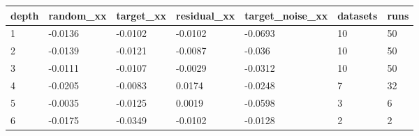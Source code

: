 \begin{tabular}{lllllll}
\toprule
depth & random\_xx & target\_xx & residual\_xx & target\_noise\_xx & datasets & runs \\
\midrule
1 & -0.0136 & -0.0102 & -0.0102 & -0.0693 & 10 & 50 \\
2 & -0.0139 & -0.0121 & -0.0087 & -0.036 & 10 & 50 \\
3 & -0.0111 & -0.0107 & -0.0029 & -0.0312 & 10 & 50 \\
4 & -0.0205 & -0.0083 & 0.0174 & -0.0248 & 7 & 32 \\
5 & -0.0035 & -0.0125 & 0.0019 & -0.0598 & 3 & 6 \\
6 & -0.0175 & -0.0349 & -0.0102 & -0.0128 & 2 & 2 \\
\bottomrule
\end{tabular}
